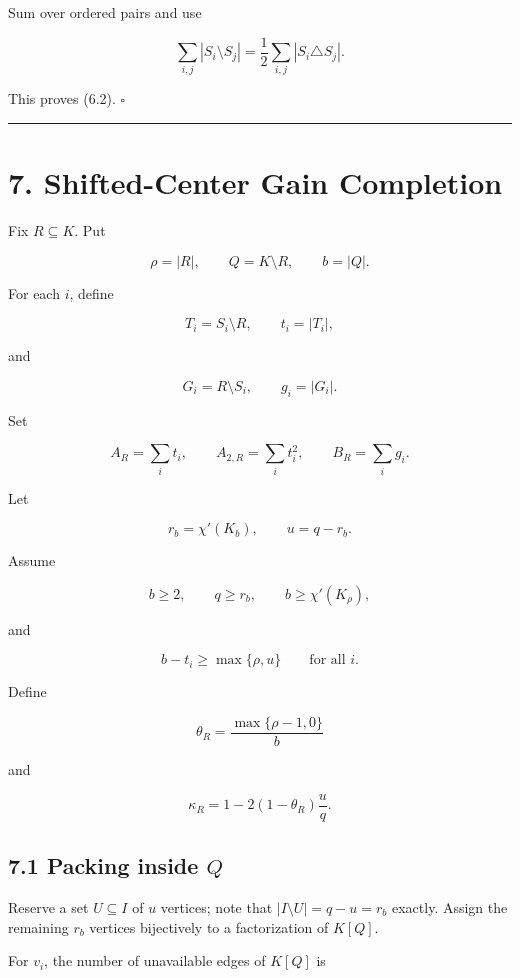 \documentclass[
  11pt,
]{article}
\begin{document}
Sum over ordered pairs and use

\[
\sum_{i,j}|S_i\setminus S_j|
=
\frac12\sum_{i,j}|S_i\triangle S_j|.
\]

This proves (6.2). \(\square\)

\begin{center}\rule{0.5\linewidth}{0.5pt}\end{center}

\section{7. Shifted-Center Gain
Completion}\label{shifted-center-gain-completion}

Fix \(R\subseteq K\). Put

\[
\rho=|R|,
\qquad
Q=K\setminus R,
\qquad
b=|Q|.
\]

For each \(i\), define

\[
T_i=S_i\setminus R,
\qquad
t_i=|T_i|,
\]

and

\[
G_i=R\setminus S_i,
\qquad
g_i=|G_i|.
\]

Set

\[
A_R=\sum_i t_i,
\qquad
A_{2,R}=\sum_i t_i^2,
\qquad
B_R=\sum_i g_i.
\]

Let

\[
r_b=\chi'(K_b),
\qquad
u=q-r_b.
\]

Assume

\[
b\ge2,
\qquad
q\ge r_b,
\qquad
b\ge\chi'(K_\rho),
\tag{7.1}
\]

and

\[
b-t_i\ge\max\{\rho,u\}
\qquad
\text{for all }i.
\tag{7.2}
\]

Define

\[
\theta_R=\frac{\max\{\rho-1,0\}}{b}
\]

and

\[
\kappa_R
=
1-2(1-\theta_R)\frac{u}{q}.
\tag{7.3}
\]

\subsection{\texorpdfstring{7.1 Packing inside
\(Q\)}{7.1 Packing inside Q}}\label{packing-inside-q}

Reserve a set \(U\subseteq I\) of \(u\) vertices; note that
\(|I\setminus U|=q-u=r_b\) exactly. Assign the remaining \(r_b\)
vertices bijectively to a factorization of \(K[Q]\).

For \(v_i\), the number of unavailable edges of \(K[Q]\) is
\end{document}
